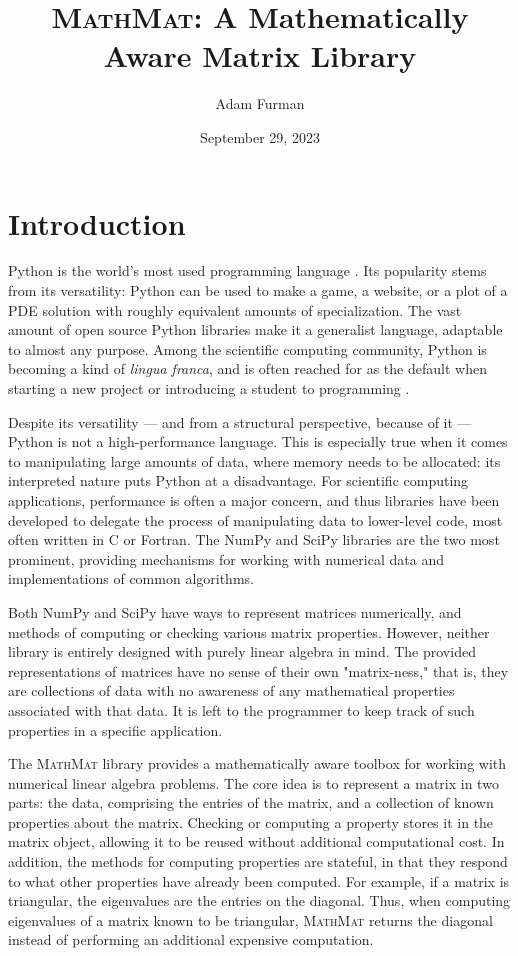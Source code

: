 \documentclass[12pt,a4paper]{article}
\title{\textsc{MathMat}: A Mathematically Aware Matrix Library}
\author{Adam Furman}
\date{September 29, 2023}
\newcommand{\mathmat}{\textsc{MathMat} }
\begin{document}
\maketitle

\thispagestyle{empty}

\newpage
\setcounter{page}{1}

\tableofcontents

\section{Introduction}

Python is the world's most used programming language \cite{Carbonnelle2023}. Its popularity stems from its versatility: Python can be used to make a game, a website, or a plot of a PDE solution with roughly equivalent amounts of specialization. The vast amount of open source Python libraries make it a generalist language, adaptable to almost any purpose. Among the scientific computing community, Python is becoming a kind of \textit{lingua franca}, and is often reached for as the default when starting a new project or introducing a student to programming \cite{Wang2022}.

Despite its versatility --- and from a structural perspective, because of it --- Python is not a high-performance language. This is especially true when it comes to manipulating large amounts of data, where memory needs to be allocated: its interpreted nature puts Python at a disadvantage. For scientific computing applications, performance is often a major concern, and thus libraries have been developed to delegate the process of manipulating data to lower-level code, most often written in C or Fortran. The NumPy \cite{NumPy} and SciPy \cite{SciPy} libraries are the two most prominent, providing mechanisms for working with numerical data and implementations of  common algorithms.

Both NumPy and SciPy have ways to represent matrices numerically, and methods of computing or checking various matrix properties. However, neither library is entirely designed with purely linear algebra in mind. The provided representations of matrices have no sense of their own "matrix-ness," that is, they are collections of data with no awareness of any mathematical properties associated with that data. It is left to the programmer to keep track of such properties in a specific application.

The \mathmat library provides a mathematically aware toolbox for working with numerical linear algebra problems. The core idea is to represent a matrix in two parts: the data, comprising the entries of the matrix, and a collection of known properties about the matrix. Checking or computing a property stores it in the matrix object, allowing it to be reused without additional computational cost. In addition, the methods for computing properties are stateful, in that they respond to what other properties have already been computed.  For example, if a matrix is triangular, the eigenvalues are the entries on the diagonal. Thus, when computing eigenvalues of a matrix known to be triangular, \mathmat returns the diagonal instead of performing an additional expensive computation.
\end{document}
